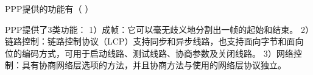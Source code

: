 \question PPP提供的功能有（ ）
\par{}
\begin{solution}PPP提供了3类功能： 1）成帧：它可以毫无歧义地分割出一帧的起始和结束。
2）链路控制：链路控制协议（LCP）支持同步和异步线路，也支持面向字节和面向位的编码方式，可用于启动线路、测试线路、协商参数及关闭线路。
3）网络控制：具有协商网络层选项的方法，并且协商方法与使用的网络层协议独立。
\end{solution}
